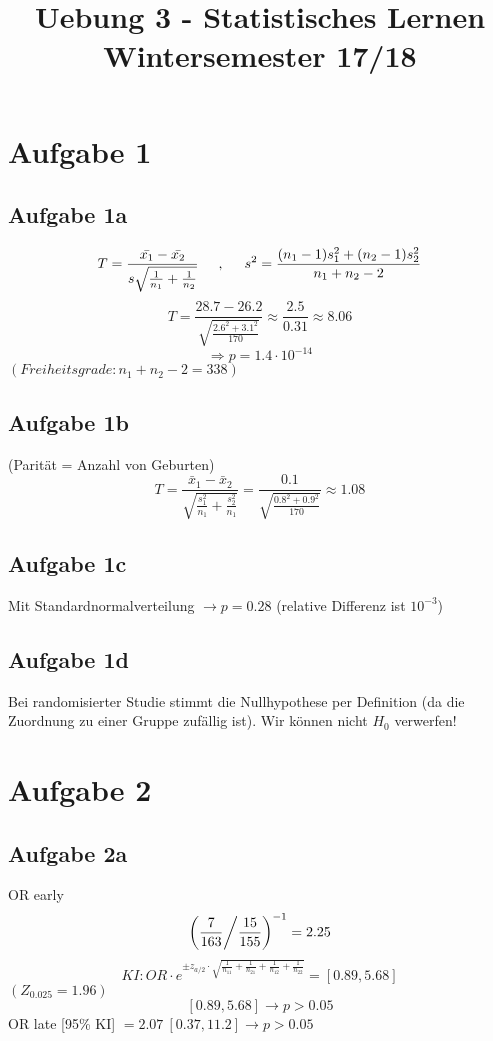 \documentclass[10pt,a4paper]{article}
\title{Uebung 3 - Statistisches Lernen\\ \large{Wintersemester 17/18}}
\date{}
\begin{document}
	\maketitle
\section{Aufgabe 1}
\subsection{Aufgabe 1a}
\[ T = \frac{\bar{x_1} - \bar{x_2}}{s \sqrt{\frac{1}{n_1} + \frac{1}{n_2}}} \hspace{0.5cm},\hspace{0.5cm} s^2 = \frac{(n_1 - 1) s_1^2 + (n_2 -1) s_2^2}{n_1 + n_2 -2} \]
\[ T = \frac{28.7 - 26.2}{\sqrt{\frac{2.6^2 + 3.1^2}{170}}} \approx \frac{2.5}{0.31} \approx 8.06 \]
\[ \Rightarrow p= 1.4 \cdot 10^{-14} \]
$(Freiheitsgrade: n_1 + n_2 -2 = 338)$ \\

\subsection{Aufgabe 1b}
(Parität = Anzahl von Geburten) 
\[ T = \frac{\bar{x}_1 - \bar{x}_2 }{\sqrt{\frac{s_1^2}{n_1} + \frac{s_2^2}{n_1}}} = \frac{0.1}{\sqrt{\frac{0.8^2 + 0.9^2}{170}}} \approx 1.08 \]

\subsection{Aufgabe 1c}
Mit Standardnormalverteilung $\rightarrow p=0.28$ (relative Differenz ist $10^{-3}$)

\subsection{Aufgabe 1d}
Bei randomisierter Studie stimmt die Nullhypothese per Definition (da die Zuordnung zu einer Gruppe zufällig ist). Wir können nicht $H_0$ verwerfen!

\section{Aufgabe 2}
\subsection{Aufgabe 2a}
OR early
\[ \left(\frac{7}{163} \middle/ \frac{15}{155} \right)^{-1} = 2.25  \] 
\vspace{1cm}
\[KI: OR \cdot e^{\pm z_{a/2} \cdot \sqrt{\frac{1}{n_{11}} + \frac{1}{n_{21}} + \frac{1}{n_{12}} + \frac{1}{n_{22}}}} = [0.89,5.68] \]
$(Z_{0.025}=1.96)$
\[ [0.89,5.68] \rightarrow p > 0.05 \] 
OR late [95\% KI] $= 2.07 \ [0.37,11.2] \rightarrow p > 0.05 $
\end{document}
